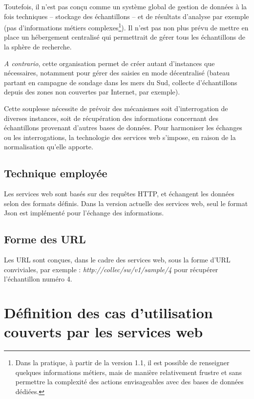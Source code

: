 Toutefois, il n'est pas conçu comme un système global de gestion de données à la fois techniques -- stockage des échantillons -- et de résultats d'analyse par exemple (pas d'informations métiers complexes\footnote{Dans la pratique, à partir de la version 1.1, il est possible de renseigner quelques informations métiers, mais de manière relativement frustre et sans permettre la complexité des actions envisageables avec des bases de données dédiées.}).
Il n'est pas non plus prévu de mettre en place un hébergement centralisé qui permettrait de gérer tous les échantillons de la sphère de recherche.

\textit{A contrario}, cette organisation permet de créer autant d'instances que nécessaires, notamment pour gérer des saisies en mode décentralisé (bateau partant en campagne de sondage dans les mers du Sud, collecte d'échantillons depuis des zones non couvertes par Internet, par exemple).

Cette souplesse nécessite de prévoir des mécanismes soit d'interrogation de diverses instances, soit de récupération des informations concernant des échantillons provenant d'autres bases de données. 
Pour harmoniser les échanges ou les interrogations, la technologie des services web s'impose, en raison de la normalisation qu'elle apporte.

\subsection{Technique employée}

Les services web sont basés sur des requêtes HTTP, et échangent les données selon des formats définis. Dans la version actuelle des services web, seul le format Json est implémenté pour l'échange des informations.

\subsection{Forme des URL}
Les URL sont conçues, dans le cadre des services web, sous la forme d'URL conviviales, par exemple : \textit{http://collec/sw/v1/sample/4} pour récupérer l'échantillon numéro 4.

\section{Définition des cas d'utilisation couverts par les services web}

